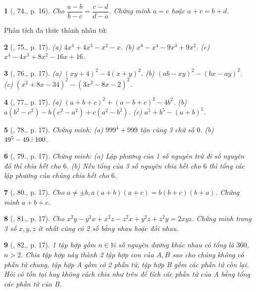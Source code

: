 \documentclass{article}
\newtheorem{baitoan}{}
\DeclareRobustCommand{\divby}{%
	\mathrel{\vbox{\baselineskip.65ex\lineskiplimit0pt\hbox{.}\hbox{.}\hbox{.}}}%
}
\begin{document}
\begin{baitoan}[\cite{Tuyen_Toan_8}, 74., p. 16]
	Cho $\dfrac{a - b}{b - c} = \dfrac{c - d}{d - a}$. Chứng minh $a = c$ hoặc $a + c = b + d$.
\end{baitoan}
Phân tích đa thức thành nhân tử:

\begin{baitoan}[\cite{Tuyen_Toan_8}, 75., p. 17]
	(a) $4x^4 + 4x^3 - x^2 - x$. (b) $x^6 - x^4 - 9x^3 + 9x^2$. (c) $x^4 - 4x^3 + 8x^2 - 16x + 16$.
\end{baitoan}

\begin{baitoan}[\cite{Tuyen_Toan_8}, 76., p. 17]
	(a) $(xy + 4)^2 - 4(x + y)^2$. (b) $(ab - xy)^2 - (bx - ay)^2$. (c) $(x^2 + 8x - 34)^2 - (3x^2 - 8x - 2)^2$.
\end{baitoan}

\begin{baitoan}[\cite{Tuyen_Toan_8}, 77., p. 17]
	(a) $(a + b + c)^2 + (a - b + c)^2 - 4b^2$. (b) $a(b^2 - c^2) - b(c^2 - a^2) + c(a^2 - b^2)$. (c) $a^5 + b^5 - (a + b)^5$.
\end{baitoan}

\begin{baitoan}[\cite{Tuyen_Toan_8}, 78., p. 17]
	Chứng minh: (a) $999^4 + 999$ tận cùng 3 chữ số $0$. (b) $49^5 - 49\divby100$.
\end{baitoan}

\begin{baitoan}[\cite{Tuyen_Toan_8}, 79., p. 17]
	Chứng minh: (a) Lập phương của 1 số nguyên trừ đi số nguyên đó thì chia hết cho $6$. (b) Nếu tổng của 3 số nguyên chia hết cho $6$ thì tổng các lập phương của chúng chia hết cho $6$.
\end{baitoan}

\begin{baitoan}[\cite{Tuyen_Toan_8}, 80., p. 17]
	Cho $a\ne\pm b,a(a + b)(a + c) = b(b + c)(b + a)$. Chứng minh $a + b + c$.
\end{baitoan}

\begin{baitoan}[\cite{Tuyen_Toan_8}, 81., p. 17]
	Cho $x^2y - y^2x + x^2z - z^2x + y^2z + z^2y = 2xyz$. Chứng minh trong 3 số $x,y,z$ ít nhất cũng có 2 số bằng nhau hoặc đối nhau.
\end{baitoan}

\begin{baitoan}[\cite{Tuyen_Toan_8}, 82., p. 17]
	1 tập hợp gồm $n\in\mathbb{N}$ số nguyên dương khác nhau có tổng là $360$, $n > 2$. Chia tập hợp này thành 2 tập hợp con của $A,B$ sao cho chúng không có phần tử chung, tập hợp A gồm có 2 phần tử, tập hợp B gồm các phần tử còn lại. Hỏi có tồn tại hay không cách chia như trên để tích các phần tử của A bằng tổng các phần tử của B.
\end{baitoan}
\end{document}
